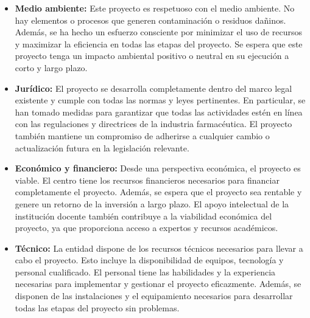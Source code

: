 \begin{itemize}
\item \textbf{Medio ambiente:} Este proyecto es respetuoso con el medio ambiente. No hay elementos o procesos que generen contaminación o residuos dañinos. Además, se ha hecho un esfuerzo consciente por minimizar el uso de recursos y maximizar la eficiencia en todas las etapas del proyecto. Se espera que este proyecto tenga un impacto ambiental positivo o neutral en su ejecución a corto y largo plazo.

\item \textbf{Jurídico:} El proyecto se desarrolla completamente dentro del marco legal existente y cumple con todas las normas y leyes pertinentes. En particular, se han tomado medidas para garantizar que todas las actividades estén en línea con las regulaciones y directrices de la industria farmacéutica. El proyecto también mantiene un compromiso de adherirse a cualquier cambio o actualización futura en la legislación relevante.

\item \textbf{Económico y financiero:} Desde una perspectiva económica, el proyecto es viable. El centro tiene los recursos financieros necesarios para financiar completamente el proyecto. Además, se espera que el proyecto sea rentable y genere un retorno de la inversión a largo plazo. El apoyo intelectual de la institución docente también contribuye a la viabilidad económica del proyecto, ya que proporciona acceso a expertos y recursos académicos.

\item \textbf{Técnico:} La entidad dispone de los recursos técnicos necesarios para llevar a cabo el proyecto. Esto incluye la disponibilidad de equipos, tecnología y personal cualificado. El personal tiene las habilidades y la experiencia necesarias para implementar y gestionar el proyecto eficazmente. Además, se disponen de las instalaciones y el equipamiento necesarios para desarrollar todas las etapas del proyecto sin problemas.
\end{itemize}









